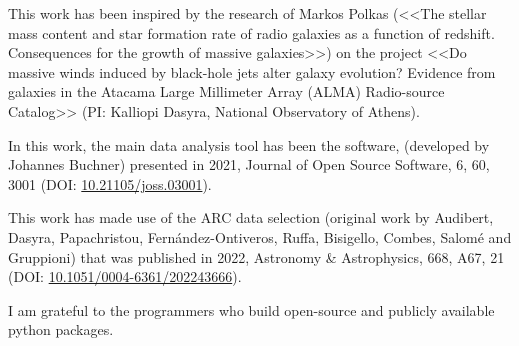 This work has been inspired by the research of Markos Polkas (<<The stellar mass content and star formation rate of radio galaxies as a function of redshift. Consequences for the growth of massive galaxies>>) on the project <<Do massive winds induced by black-hole jets alter galaxy evolution? Evidence from galaxies in the Atacama Large Millimeter Array (ALMA) Radio-source Catalog>> (PI: Kalliopi Dasyra, National Observatory of Athens).

In this work, the main data analysis tool has been the  software, (developed by Johannes Buchner) presented in 2021, Journal of Open Source Software, 6, 60, 3001 (DOI: \url{10.21105/joss.03001}).

This work has made use of the ARC data selection (original work by Audibert, Dasyra, Papachristou, Fernández-Ontiveros, Ruffa, Bisigello, Combes, Salomé and Gruppioni) that was published in 2022, Astronomy \& Astrophysics, 668, A67, 21 (DOI: \url{10.1051/0004-6361/202243666}).


I am grateful to the programmers who build open-source and publicly
available python packages.